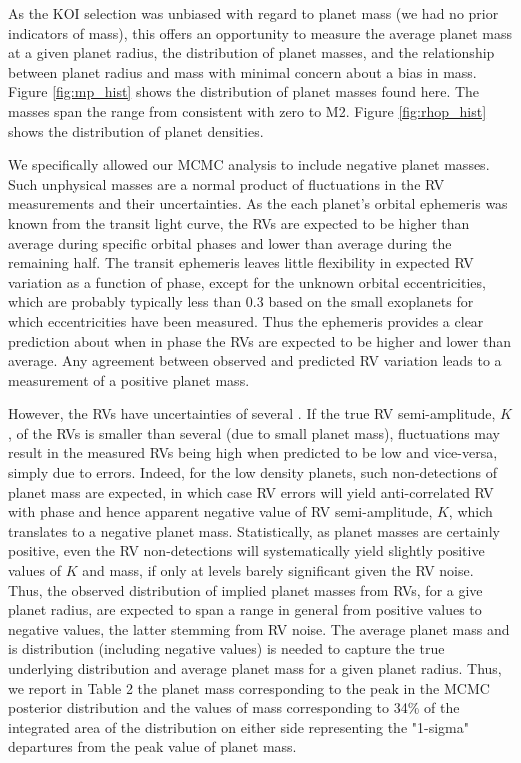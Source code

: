 \documentclass{emulateapj}
\begin{document}
As the KOI selection was unbiased with regard to planet mass (we had no prior indicators of mass), this offers an opportunity to measure the average planet mass at a given planet radius, the distribution of planet masses, and the relationship between planet radius and mass with minimal concern about a bias in mass.  Figure \ref{fig:mp_hist}  shows the distribution of planet masses found here.  The masses span the range from consistent with zero to M2.  Figure \ref{fig:rhop_hist} shows the distribution of planet densities.

We specifically allowed our MCMC analysis to include negative planet masses.   Such unphysical masses are a normal product of fluctuations in the RV measurements and their uncertainties.  As the each planet's orbital ephemeris was known from the transit light curve, the RVs are expected to be higher than average during specific orbital phases and lower than average during the remaining half.  The transit ephemeris leaves little flexibility in expected RV variation as a function of phase, except for the unknown orbital eccentricities, which are probably typically less than 0.3 based on the small exoplanets for which eccentricities have been measured.  Thus the ephemeris provides a clear prediction about when in phase the RVs are expected to be higher and lower than average.  Any agreement between observed and predicted RV variation leads to a measurement of a positive planet mass.  

However, the RVs have uncertainties of several \mse.  If the true RV semi-amplitude, $K$, of the RVs is smaller than several \mse (due to small planet mass), fluctuations may result in the measured RVs being high when predicted to be low and vice-versa, simply due to errors.  Indeed, for the low density planets, such non-detections of planet mass are expected, in which case RV errors will yield anti-correlated RV with phase and hence apparent negative value of RV semi-amplitude, $K$, which translates to a negative planet mass.  Statistically, as planet masses are certainly positive, even the RV non-detections will systematically yield slightly positive values of $K$ and mass, if only at levels barely significant given the RV noise.  Thus, the observed distribution of implied planet masses from RVs, for a give planet radius, are expected to span a range in general from positive values to negative values, the latter stemming from RV noise.  The average planet mass and is distribution (including negative values) is needed to capture the true underlying distribution and average planet mass for a given planet radius.  Thus, we report in Table 2 the planet mass corresponding to the peak in the MCMC posterior distribution and the values of mass corresponding to 34\% of the integrated area of the distribution on either side representing the "1-sigma" departures from the peak value of planet mass.
\end{document}
